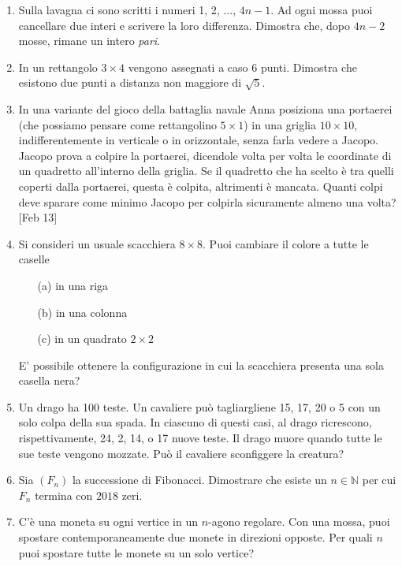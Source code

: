 \documentclass[a4paper]{article}
\theoremstyle{remark}
\theoremstyle{definition}
\begin{document}
\begin{enumerate}
	\item Sulla lavagna ci sono scritti i numeri 1, 2, $ \dots $, $ 4n-1 $. Ad ogni mossa puoi cancellare due interi e scrivere la loro differenza. Dimostra che, dopo $ 4n-2 $ mosse, rimane un intero \emph{pari}.
	
	\item In un rettangolo $ 3 \times 4 $ vengono assegnati a caso $ 6 $ punti. Dimostra che esistono due punti a distanza non maggiore di $  \sqrt5 $.
	
	\item In una variante del gioco della battaglia navale Anna posiziona una portaerei (che possiamo
	pensare come rettangolino $ 5 \times 1 $) in una griglia $ 10 \times 10 $, indifferentemente in verticale o in orizzontale, senza farla vedere a Jacopo. Jacopo prova a colpire la portaerei, dicendole volta per
	volta le coordinate di un quadretto all’interno della griglia. Se il quadretto che ha scelto è tra
	quelli coperti dalla portaerei, questa è colpita, altrimenti è mancata. Quanti colpi deve sparare
	come minimo Jacopo per colpirla sicuramente almeno una volta? [Feb 13]
	
	\item Si consideri un usuale scacchiera $ 8 \times 8 $. Puoi cambiare il colore a tutte le caselle
	\begin{itemize}
		\item[(a)] in una riga
		\item[(b)] in una colonna
		\item[(c)] in un quadrato $ 2 \times 2 $
	\end{itemize}
	E' possibile ottenere la configurazione in cui la scacchiera presenta una sola casella nera?
	
	\item Un drago ha 100 teste. Un cavaliere può tagliargliene 15, 17, 20 o 5 con un solo colpa della sua spada. In ciascuno di questi casi, al drago ricrescono, rispettivamente, 24, 2, 14, o 17 nuove teste. Il drago muore quando tutte le sue teste vengono mozzate. Può il cavaliere sconfiggere la creatura?
	
	\item Sia $ (F_n) $ la successione di Fibonacci. Dimostrare che esiste un $ n \in \mathbb{N} $ per cui $ F_n $ termina con $ 2018 $ zeri.
	
	\item C'è una moneta su ogni vertice in un $ n $-agono regolare. Con una mossa, puoi spostare contemporaneamente due monete in direzioni opposte. Per quali $ n $ puoi spostare tutte le monete su un solo vertice?
	

\end{enumerate}
\end{document}
